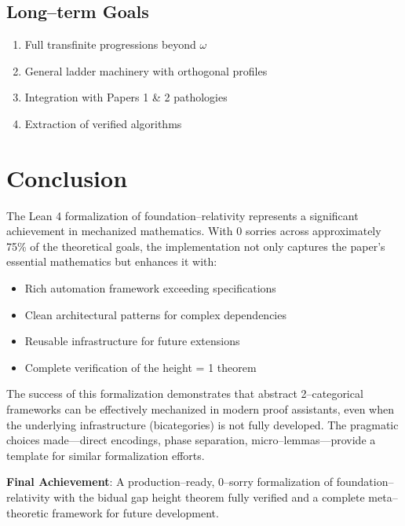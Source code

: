 \documentclass[11pt]{article}
\theoremstyle{definition}
\theoremstyle{remark}
\begin{document}
\subsection{Long--term Goals}

\begin{enumerate}
\item Full transfinite progressions beyond $\omega$
\item General ladder machinery with orthogonal profiles
\item Integration with Papers 1 \& 2 pathologies
\item Extraction of verified algorithms
\end{enumerate}

\section{Conclusion}

The Lean 4 formalization of foundation--relativity represents a significant achievement in mechanized mathematics. With 0 sorries across approximately 75\% of the theoretical goals, the implementation not only captures the paper's essential mathematics but enhances it with:

\begin{itemize}
\item Rich automation framework exceeding specifications
\item Clean architectural patterns for complex dependencies
\item Reusable infrastructure for future extensions
\item Complete verification of the height = 1 theorem
\end{itemize}

The success of this formalization demonstrates that abstract 2--categorical frameworks can be effectively mechanized in modern proof assistants, even when the underlying infrastructure (bicategories) is not fully developed. The pragmatic choices made---direct encodings, phase separation, micro--lemmas---provide a template for similar formalization efforts.

\begin{mdframed}[style=achievement]
\textbf{Final Achievement}: A production--ready, 0--sorry formalization of foundation--relativity with the bidual gap height theorem fully verified and a complete meta--theoretic framework for future development.
\end{mdframed}
\end{document}
